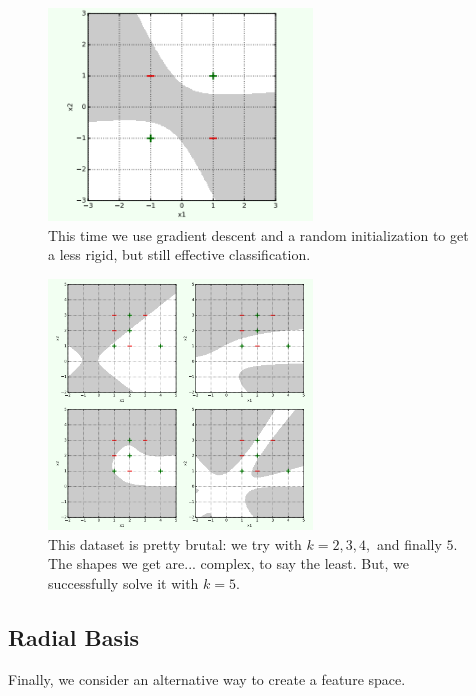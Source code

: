             \begin{figure}[H]
                \centering
                
                \includegraphics[width=70mm,scale=0.5]{images/feature_images/better_xor.png}
                \caption*{This time we use gradient descent and a random initialization to get a less rigid, but still effective classification. }
            \end{figure}

             \begin{figure}[H]
                \centering
                
                \includegraphics[width=70mm,scale=0.5]{images/feature_images/harder_dataset.png}
                \caption*{This dataset is pretty brutal: we try with $k=2,3,4,$ and finally $5$. The shapes we get are... complex, to say the least. But, we successfully solve it with $k=5$.}
            \end{figure}

        \subsecdiv
        \subsection{Radial Basis}

            Finally, we consider an alternative way to create a feature space.

